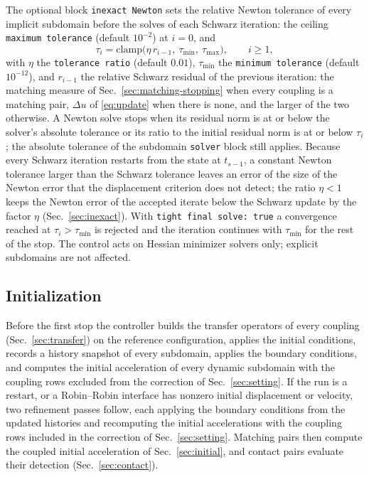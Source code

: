 \documentclass[11pt]{article}
\newcommand{\code}[1]{\texttt{#1}}
\begin{document}
The optional block \code{inexact Newton} sets the relative Newton tolerance
of every implicit subdomain before the solves of each Schwarz iteration:
the ceiling \code{maximum tolerance} (default $10^{-2}$) at $i = 0$, and
\begin{equation}
  \tau_i = \mathrm{clamp}\bigl(\eta\, r_{i-1},\ \tau_{\min},\ \tau_{\max}\bigr),
  \qquad i \ge 1,
  \label{eq:inexact}
\end{equation}
with $\eta$ the \code{tolerance ratio} (default $0.01$), $\tau_{\min}$ the
\code{minimum tolerance} (default $10^{-12}$), and $r_{i-1}$ the relative
Schwarz residual of the previous iteration: the matching measure of
Sec.~\ref{sec:matching-stopping} when every coupling is a matching pair,
$\Delta u$ of \eqref{eq:update} when there is none, and the larger of the
two otherwise. A Newton solve stops when its residual norm is at or below
the solver's absolute tolerance or its ratio to the initial residual norm
is at or below $\tau_i$; the absolute tolerance of the subdomain
\code{solver} block still applies. Because every Schwarz iteration restarts
from the state at $t_{s-1}$, a constant Newton tolerance larger than the
Schwarz tolerance leaves an error of the size of the Newton error that the
displacement criterion does not detect; the ratio $\eta < 1$ keeps the
Newton error of the accepted iterate below the Schwarz update by the factor
$\eta$ (Sec.~\ref{sec:inexact}). With \code{tight final solve: true} a
convergence reached at $\tau_i > \tau_{\min}$ is rejected and the iteration
continues with $\tau_{\min}$ for the rest of the stop. The control acts on
Hessian minimizer solvers only; explicit subdomains are not affected.

\subsection{Initialization}
\label{sec:initialization}

Before the first stop the controller builds the transfer operators of
every coupling (Sec.~\ref{sec:transfer}) on the reference configuration,
applies the initial conditions, records a history snapshot of every
subdomain, applies the boundary conditions, and computes the initial
acceleration of every dynamic subdomain with the coupling rows excluded
from the correction of Sec.~\ref{sec:setting}. If the run is a restart, or
a Robin--Robin interface has nonzero initial displacement or velocity, two
refinement passes follow, each applying the boundary conditions from the
updated histories and recomputing the initial accelerations with the
coupling rows included in the correction of Sec.~\ref{sec:setting}.
Matching pairs then compute the coupled initial acceleration of
Sec.~\ref{sec:initial}, and contact pairs evaluate their detection
(Sec.~\ref{sec:contact}).
\end{document}
